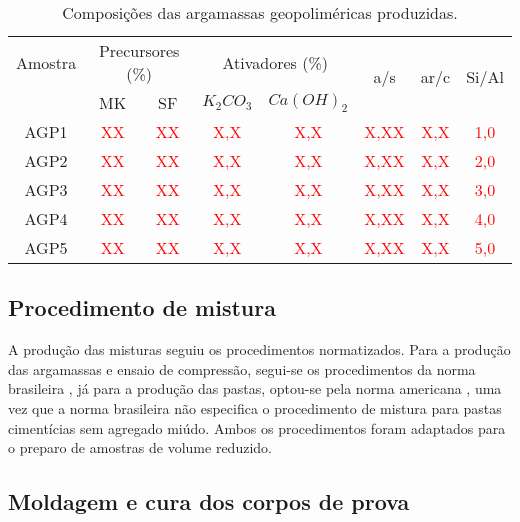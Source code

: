 \begin{table}[H]
    \caption{Composições das argamassas geopoliméricas produzidas.}
    \label{tab:composicoes_argamassas}
    \center
    \begin{tabular}{cccccccc}
    \hline
    Amostra & \multicolumn{2}{c}{Precursores (\%)} & \multicolumn{2}{c}{Ativadores (\%)} & \multirow{2}{*}{a/s} & \multirow{2}{*}{ar/c} & \multirow{2}{*}{Si/Al} \\
    \cline{2-5}
     & MK & SF & $K_2CO_3$ & $Ca(OH)_2$ & & \\
    \hline
     AGP1 & \textcolor{red}{XX} & \textcolor{red}{XX} & \textcolor{red}{X,X} & \textcolor{red}{X,X} & \textcolor{red}{X,XX} & \textcolor{red}{X,X} & \textcolor{red}{1,0} \\
    AGP2 & \textcolor{red}{XX} & \textcolor{red}{XX} & \textcolor{red}{X,X} & \textcolor{red}{X,X} & \textcolor{red}{X,XX} & \textcolor{red}{X,X} & \textcolor{red}{2,0} \\
    AGP3 & \textcolor{red}{XX} & \textcolor{red}{XX} & \textcolor{red}{X,X} & \textcolor{red}{X,X} & \textcolor{red}{X,XX} & \textcolor{red}{X,X} & \textcolor{red}{3,0} \\
    AGP4 & \textcolor{red}{XX} & \textcolor{red}{XX} & \textcolor{red}{X,X} & \textcolor{red}{X,X} & \textcolor{red}{X,XX} & \textcolor{red}{X,X} & \textcolor{red}{4,0} \\
    AGP5 & \textcolor{red}{XX} & \textcolor{red}{XX} & \textcolor{red}{X,X} & \textcolor{red}{X,X} & \textcolor{red}{X,XX} & \textcolor{red}{X,X} & \textcolor{red}{5,0} \\
    \hline
    \end{tabular}
\end{table}

\subsection{Procedimento de mistura}
\label{subsec:procedimento_de_mistura}

A produção das misturas seguiu os procedimentos normatizados.
Para a produção das argamassas e ensaio de compressão, segui-se os procedimentos da norma brasileira \cite{ABNT_NBR_7215_2019}, já para a produção das pastas, optou-se pela norma americana \cite{ASTM_C305_2006}, uma vez que a norma brasileira não especifica o procedimento de mistura para pastas cimentícias sem agregado miúdo.
Ambos os procedimentos foram adaptados para o preparo de amostras de volume reduzido.

\subsection{Moldagem e cura dos corpos de prova}
\label{subsec:moldagem_e_cura_dos_corpos_de_prova}

